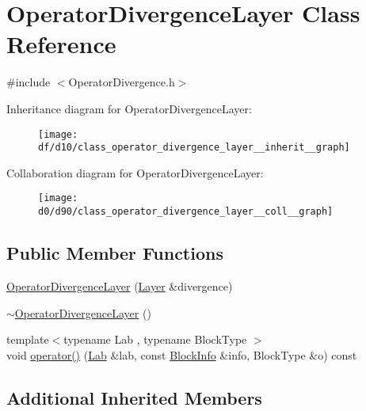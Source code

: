 \hypertarget{class_operator_divergence_layer}{}\section{Operator\+Divergence\+Layer Class Reference}
\label{class_operator_divergence_layer}


{\ttfamily \#include $<$Operator\+Divergence.\+h$>$}



Inheritance diagram for Operator\+Divergence\+Layer\+:\nopagebreak
\begin{figure}[H]
\begin{center}
\leavevmode
\texttt{[image: df/d10/class\_operator\_divergence\_layer\_\_inherit\_\_graph]}
\end{center}
\end{figure}


Collaboration diagram for Operator\+Divergence\+Layer\+:\nopagebreak
\begin{figure}[H]
\begin{center}
\leavevmode
\texttt{[image: d0/d90/class\_operator\_divergence\_layer\_\_coll\_\_graph]}
\end{center}
\end{figure}
\subsection*{Public Member Functions}
\begin{DoxyCompactItemize}
\item 
\hyperlink{class_operator_divergence_layer_abae01528fbc5323cfeab708f5942fc0c}{Operator\+Divergence\+Layer} (\hyperlink{struct_layer}{Layer} \&divergence)
\item 
\hyperlink{class_operator_divergence_layer_ab879de5dd496c4f07b8c6c2c632050f2}{$\sim$\+Operator\+Divergence\+Layer} ()
\item 
{\footnotesize template$<$typename Lab , typename Block\+Type $>$ }\\void \hyperlink{class_operator_divergence_layer_a764c3ca9116897888c989ff440460e04}{operator()} (\hyperlink{_definitions_8h_ae720d9054713370bbf4c86860e4dde70}{Lab} \&lab, const \hyperlink{struct_block_info}{Block\+Info} \&info, Block\+Type \&o) const 
\end{DoxyCompactItemize}
\subsection*{Additional Inherited Members}


